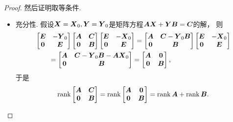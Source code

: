 \begin{example}
\begin{proof}
然后证明取等条件.
\begin{itemize}
	\item 充分性.
	假设\(\boldsymbol{X} = \boldsymbol{X}_0, \boldsymbol{Y} = \boldsymbol{Y}_0\)是矩阵方程\(\boldsymbol{A}\boldsymbol{X}+\boldsymbol{Y}\boldsymbol{B}=\boldsymbol{C}\)的解，
	则\begin{align*}
		&\begin{bmatrix}
			\boldsymbol{E} & -\boldsymbol{Y}_0 \\
			\boldsymbol0 & \boldsymbol{E}
		\end{bmatrix}
		\begin{bmatrix}
			\boldsymbol{A} & \boldsymbol{C} \\
			\boldsymbol0 & \boldsymbol{B}
		\end{bmatrix}
		\begin{bmatrix}
			\boldsymbol{E} & -\boldsymbol{X}_0 \\
			\boldsymbol0 & \boldsymbol{E}
		\end{bmatrix}
		= \begin{bmatrix}
			\boldsymbol{A} & \boldsymbol{C}-\boldsymbol{Y}_0\boldsymbol{B} \\
			\boldsymbol0 & \boldsymbol{B}
		\end{bmatrix}
		\begin{bmatrix}
			\boldsymbol{E} & -\boldsymbol{X}_0 \\
			\boldsymbol0 & \boldsymbol{E}
		\end{bmatrix} \\
		&\hspace{20pt}= \begin{bmatrix}
			\boldsymbol{A} & \boldsymbol{C}-\boldsymbol{Y}_0\boldsymbol{B}-\boldsymbol{A}\boldsymbol{X}_0 \\
			\boldsymbol0 & \boldsymbol{B}
		\end{bmatrix}
		= \begin{bmatrix}
			\boldsymbol{A} & \boldsymbol0 \\
			\boldsymbol0 & \boldsymbol{B}
		\end{bmatrix},
	\end{align*}
	于是\begin{equation*}
		\rank\begin{bmatrix}
			\boldsymbol{A} & \boldsymbol{C} \\
			\boldsymbol0 & \boldsymbol{B}
		\end{bmatrix}
		= \rank\begin{bmatrix}
			\boldsymbol{A} & \boldsymbol0 \\
			\boldsymbol0 & \boldsymbol{B}
		\end{bmatrix}
		= \rank \boldsymbol{A} + \rank \boldsymbol{B}.
	\end{equation*}


\end{itemize}
\end{proof}
\end{example}
